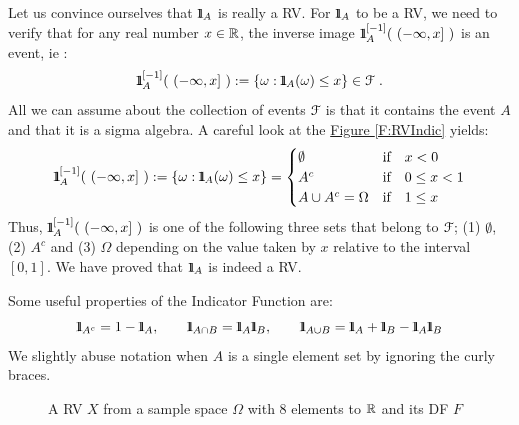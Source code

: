 \begin{classwork}
Let us convince ourselves that ${1}\mspace{-11 mu}{1}_A$ is really a RV.  For ${1}\mspace{-11 mu}{1}_A$ to be a RV, we need to verify that 
for any real number $x \in \mathbb{R}$, the inverse image $\BB{1}_A^{[-1]}( \ (- \infty, x] \ )$ is an event, ie :
\[
{1}\mspace{-11 mu}{1}_A^{[-1]}( \ (- \infty, x] \ ) := \{\omega: {1}\mspace{-11 mu}{1}_A(\omega) \leq x\} \in \mathcal{F} \ .
\] 
All we can assume about the collection of events $\mathcal{F}$ is that it contains the event $A$ and that it is a sigma algebra.  A careful look at the \hyperref[F:RVIndic]{Figure \ref*{F:RVIndic}} yields:
\begin{equation}
{1}\mspace{-11 mu}{1}_A^{[-1]}( \ (- \infty, x] \ ) := \{\omega: {1}\mspace{-11 mu}{1}_A(\omega) \leq x\} =
\begin{cases}
\emptyset & \text{if} \quad x < 0 \notag \\
A^c       & \text{if} \quad 0 \leq x < 1 \notag \\
A \cup A^c  = \Omega   & \text{if} \quad 1 \leq x  \notag 
\end{cases}
\end{equation}
Thus, $\BB{1}_A^{[-1]}( \ (- \infty, x] \ )$ is one of the following three sets that belong to $\mathcal{F}$; (1) $\emptyset$, (2) $A^c$ and (3) $\Omega$ depending on the value taken by $x$ relative to the interval $[0,1]$.  We have proved that ${1}\mspace{-11 mu}{1}_A$ is indeed a RV.
\end{classwork}
Some useful properties of the Indicator Function are:
\[
\BB{1}_{A^c} = 1 - \BB{1}_A, \qquad \BB{1}_{A \cap B} = \BB{1}_A \BB{1}_B, \qquad \BB{1}_{A \cup B} = \BB{1}_A + \BB{1}_B - \BB{1}_A \BB{1}_B
\]
We slightly abuse notation when $A$ is a single element set by ignoring the curly braces.
\begin{figure}[htpb]
\caption{A RV $X$ from a sample space $\Omega$ with $8$ elements to $\mathbb{R}$ and its DF $F$ \label{F:RVABC}}
\centering   {}
\end{figure}
